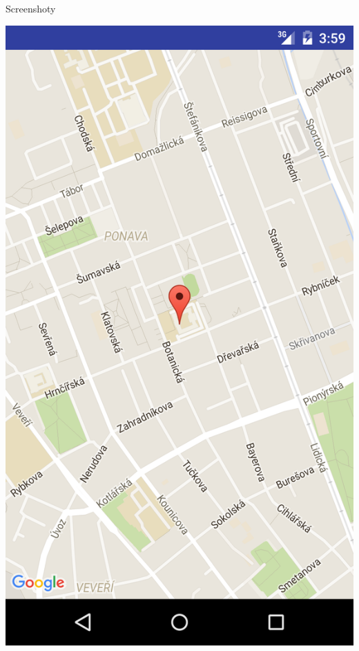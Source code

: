 \documentclass[pdf]{beamer}
\begin{document}
\begin{frame}{Screenshoty}
\begin{center}
    \includegraphics[scale=0.1]{app-map}
  \end{center}
\end{frame}
\end{document}
